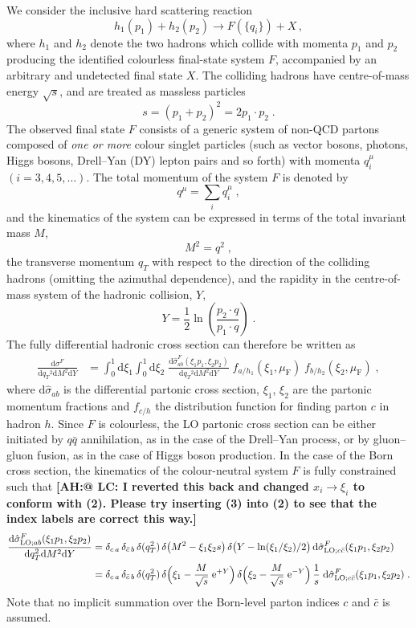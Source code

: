 \documentclass[12pt]{article}
\DeclareRobustCommand{\nn}{\nonumber}
\DeclareRobustCommand{\AH}[1]{\textbf{\quad\color{purple}[AH:\quad #1]}\xspace}
\DeclareRobustCommand{\muf}{\ensuremath{\mu_{\mathrm{F}}}\xspace}
\DeclareRobustCommand{\qt}{\ensuremath{q_T}\xspace}
\DeclareRobustCommand{\rd}{\ensuremath{\mathrm{d}}}
\DeclareRobustCommand{\re}{\ensuremath{\mathrm{e}}}
\DeclareRobustCommand{\LO}{\text{LO}\xspace}
\begin{document}
We consider the inclusive hard scattering reaction 
\begin{equation}
  h_1(p_1)+h_2(p_2)\to F(\{q_i\})+X\, ,
  \label{class}
\end{equation}
where $h_1$ and $h_2$ denote the two hadrons which collide with momenta $p_1$ and $p_2$ producing the identified colourless final-state system $F$, accompanied by an arbitrary and undetected final state $X$. The colliding hadrons have centre-of-mass energy $\sqrt s$, and are treated as massless particles 
$$s= (p_1+p_2)^2 = 2p_1\cdot p_2 \;.$$ 
The observed final state $F$ consists of a generic system of non-QCD partons composed of \emph{one or more} colour singlet particles (such as vector bosons, photons, Higgs bosons, Drell--Yan (DY) lepton pairs and so forth) with momenta $q_i^{\mu}$ $(i=3,4,5,\dots)$. The total momentum of the system $F$ is denoted by 
$$q^{\mu}=\sum_i q_i^\mu \;,$$
and the kinematics of the system can be expressed in terms of the total invariant mass $M$, 
$$M^2=q^2 \;,$$ 
the transverse momentum $\qt$ with respect to the direction of the colliding hadrons (omitting the azimuthal dependence), and the rapidity in the centre-of-mass system of the hadronic collision, $Y$, 
$$Y = \frac{1}{2} \ln \left(\frac{p_2\cdot q}{p_1\cdot q}\right) \;.$$ 
The fully differential hadronic cross section can therefore be written as 
\begin{align}
  \frac{\rd\sigma^{F}}{\rd\qt^2\rd M^2\rd Y}
  &=
  \int_0^1\rd \xi_1 \int_0^1\rd \xi_2 \; 
  \frac{\rd\hat{\sigma}^{F}_{ab}(\xi_1 p_1, \xi_2 p_2)}{\rd\qt^2\rd M^2\rd Y} \;
  f_{a/h_1}(\xi_1,\muf) \; f_{b/h_2}(\xi_2,\muf) \;,
  \label{eq:hadXS_diff}
\end{align}
where $\rd\hat{\sigma}_{ab}$ is the differential partonic cross section, $\xi_1$, $\xi_2$ are the partonic momentum fractions and $f_{c/h}$ the distribution function for finding parton $c$ in hadron $h$.
Since $F$ is colourless, the LO partonic cross section can be either initiated by 
$q\bar{q}$ annihilation, as in the case of the Drell--Yan process, or by gluon--gluon fusion, as in the case of Higgs boson production.
In the case of the Born cross section, the kinematics of the colour-neutral system $F$ is fully constrained such that
\AH{@ LC: I reverted this back and changed $x_i\to\xi_i$ to conform with (2). Please try inserting (3) into (2) to see that the index labels are correct this way.}
\begin{align}
  \frac{\rd\hat{\sigma}^{F}_{\LO;ab}(\xi_1 p_1, \xi_2 p_2)}{\rd\qt^2\rd M^2\rd Y}
  &=
  \delta_{c\,a} \, \delta_{\bar{c}\,b} \, 
  \delta(\qt^2) \,
  \delta\bigl(M^2-\xi_1 \xi_2 s\bigr) \,
  \delta\bigl(Y-\ln(\xi_1/\xi_2)/2\bigr) \,
  \rd\hat{\sigma}^{F}_{\LO;c\bar{c}}(\xi_1 p_1, \xi_2 p_2)
  \nn\\
  &=
  \delta_{c\,a} \, \delta_{\bar{c}\,b} \, 
  \delta(\qt^2) \,
  \delta\Bigl(\xi_1-\frac{M}{\sqrt{s}}\;\re^{+Y}\Bigr) \,
  \delta\Bigl(\xi_2-\frac{M}{\sqrt{s}}\;\re^{-Y}\Bigr) \,
  \frac{1}{s} \;
  \rd\hat{\sigma}^{F}_{\LO;c\bar{c}}(\xi_1 p_1, \xi_2 p_2) \;.
  \label{eq:LOpartXS_diff}
\end{align}
Note that no implicit summation over the Born-level parton indices $c$ and $\bar{c}$ is assumed.
\end{document}
